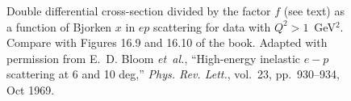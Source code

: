 \documentclass[a4paper,10pt]{article}
\begin{document}
\begin{figure}[htb]
\begin{center}
\caption{Double differential cross-section divided by the factor $f$ (see text) as a function
of Bjorken $x$ in $ep$ scattering for data with $Q^2>1$~GeV$^2$.
Compare with Figures 16.9 and 16.10 of the book.
Adapted with permission from
E.~D. Bloom {\em et~al.}, ``High-energy inelastic $e\ensuremath{-}p$ scattering
  at 6 and 10 deg,'' {\em Phys. Rev. Lett.}, vol.~23, pp.~930--934, Oct 1969.}
\end{center}
\end{figure}
%
\vskip 5cm
\doclicenseThis
\end{document}
